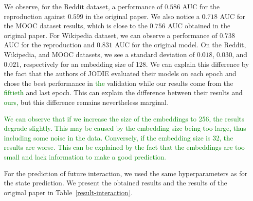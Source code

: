 We observe, for the Reddit dataset, a performance of $0.586$ AUC for the reproduction against $0.599$ in the original paper. We also notice a  $0.718$ AUC  for the MOOC dataset results, which is close to the $0.756$ AUC obtained in the original paper. For Wikipedia dataset, we can observe a performance of $0.738$ AUC for the reproduction and $0.831$ AUC for the original model. On the Reddit, Wikipedia, and MOOC datasets, we see a standard deviation of $0.018$, $0.030$, and $0.021$, respectively for an embedding size of 128. We can explain this difference by the fact that the authors of JODIE evaluated their models on each epoch and chose the best performance in \textcolor{green}{the} validation while our results come from the \textcolor{green}{fiftieth} %
and last epoch. This can explain the difference between their results and \textcolor{green}{ours,} %
but this difference remains nevertheless marginal.


\textcolor{green}{We can observe that if we increase the size of the embeddings to 256, the results degrade slightly. This may be caused by the embedding size being too large, thus including some noise in the data. Conversely, if the embedding size is 32, the results are worse. This can be explained by the fact that the embeddings are too small and lack information to make a good prediction.}

For the prediction of future interaction, we used the same hyperparameters as for the state prediction. We present the obtained results and the results of the original paper in Table~\ref{result-interaction}.

